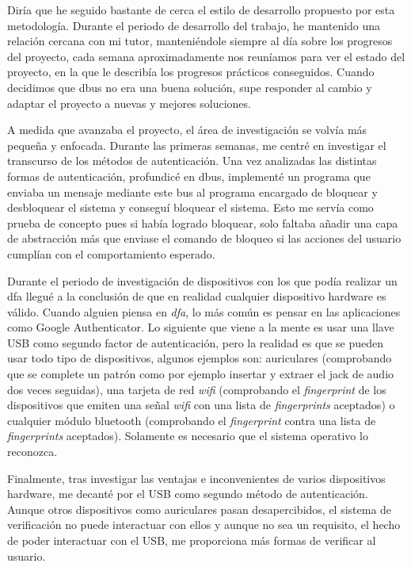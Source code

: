 \documentclass[titlepage, 12pt, a4paper]{article}
\begin{document}
Diría que he seguido bastante de cerca el estilo de desarrollo propuesto por esta metodología. Durante el periodo de desarrollo del trabajo, he mantenido una relación cercana con mi tutor, manteniéndole siempre al día sobre los progresos del proyecto, cada semana aproximadamente nos reuníamos para ver el estado del proyecto, en la que le describía los progresos prácticos conseguidos. Cuando decidimos que \Gls{dbus} no era una buena solución, supe responder al cambio y adaptar el proyecto a nuevas y mejores soluciones. \par
A medida que avanzaba el proyecto, el área de investigación se volvía más pequeña y enfocada. Durante las primeras semanas, me centré en investigar el transcurso de los métodos de autenticación. Una vez analizadas las distintas formas de autenticación, profundicé en \Gls{dbus}, implementé un programa que enviaba un mensaje mediante este bus al programa encargado de bloquear y desbloquear el sistema y conseguí bloquear el sistema. Esto me servía como prueba de concepto pues si había logrado bloquear, solo faltaba añadir una capa de abstracción más que enviase el comando de bloqueo si las acciones del usuario cumplían con el comportamiento esperado. \par
Durante el periodo de investigación de dispositivos con los que podía realizar un \Gls{dfa} llegué a la conclusión de que en realidad cualquier dispositivo hardware es válido. Cuando alguien piensa en \textit{\Gls{dfa}}, lo más común es pensar en las aplicaciones como Google Authenticator. Lo siguiente que viene a la mente es usar una llave \Gls{USB} como segundo factor de autenticación, pero la realidad es que se pueden usar todo tipo de dispositivos, algunos ejemplos son: auriculares (comprobando que se complete un patrón como por ejemplo insertar y extraer el jack de audio dos veces seguidas), una tarjeta de red \textit{\Gls{wifi}} (comprobando  el \textit{\Gls{fingerprint}} de los dispositivos que emiten una señal \textit{\Gls{wifi}} con una lista de \textit{\Gls{fingerprint}s} aceptados) o cualquier módulo \Gls{bluetooth} (comprobando el \textit{\Gls{fingerprint}} contra una lista de \textit{\Gls{fingerprint}s} aceptados). Solamente es necesario que el sistema operativo lo reconozca. \par
Finalmente, tras investigar las ventajas e inconvenientes de varios dispositivos hardware, me decanté por el \Gls{USB} como segundo método de autenticación. Aunque otros dispositivos como auriculares pasan desapercibidos, el sistema de verificación no puede interactuar con ellos y aunque no sea un requisito, el hecho de poder interactuar con el \Gls{USB}, me proporciona más formas de verificar al usuario.
\end{document}
